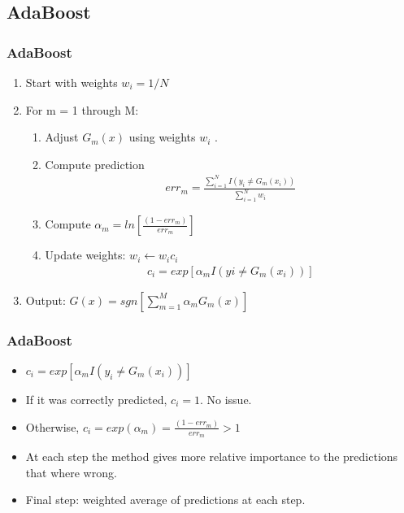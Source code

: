 \documentclass[
  shownotes,
  xcolor={svgnames},
  hyperref={colorlinks,citecolor=DarkBlue,linkcolor=DarkRed,urlcolor=DarkBlue}
  , aspectratio=169]{beamer}
\begin{document}
\subsection{AdaBoost}
\begin{frame}[fragile]
\frametitle{AdaBoost}
\begin{enumerate}
\item Start with weights $w_i = 1 / N$
\item For m = 1 through M:
\begin{enumerate}
    \item Adjust $G_m(x)$ using weights $w_i$ .
    \item Compute prediction 
    \begin{align}
    err_m = \frac{\sum_{i=1}^N  I(y_i \neq G_m(x_i))}{\sum_{i=1}^N w_i}
    \end{align}
    \item Compute $\alpha_m= ln \left[\frac{(1 - err_m )}{ err_m} \right]$
    \item Update weights: $w_i \leftarrow w_i c_i$ 
    \begin{align}
    c_i = exp \left[\alpha_m  I (y i \neq G_m (x_i )) \right]
    \end{align}
    
\end{enumerate}
\item Output: $G(x) = sgn[\sum_{m = 1}^M \alpha_m G_m(x)]$
\end{enumerate}

\end{frame} 
\begin{frame}[fragile]
\frametitle{AdaBoost}

\begin{itemize}
\item $c_i = exp \left[ \alpha_m I(y_i \neq G_m (x_i )) \right]$
\medskip
\item If it was correctly predicted, $c_i = 1$. No issue.
\medskip
\item Otherwise, $c_i = exp (\alpha_m ) = \frac{(1 - err_m ) }{err_m} > 1$ 
\medskip
\item At each step the method gives more relative importance to the predictions that where wrong.
\medskip
\item Final step: weighted average of predictions at each step.
\end{itemize}
\end{frame}
\end{document}
